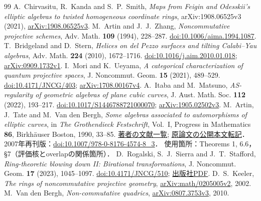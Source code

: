 \documentclass[11pt,a4paper]{ltjsarticle}
\begin{document}
\begin{thebibliography}{99}
\fontsize{11}{13.7}\selectfont
\setlength{\itemsep}{0pt}
\setlength{\parsep}{0pt}
 A.~Chirvasitu, R.~Kanda and S.~P.~Smith,
\emph{Maps from Feigin and Odesskii's elliptic algebras to twisted homogeneous coordinate rings},
arXiv:1908.06525v3 (2021),
\href{https://arxiv.org/abs/1908.06525v3}{arXiv:1908.06525v3}.
 M.~Artin and J.~J.~Zhang,
\emph{Noncommutative projective schemes}, Adv. Math. \textbf{109} (1994), 228--287.
\href{https://doi.org/10.1006/aima.1994.1087}{doi:10.1006/aima.1994.1087}.
 T.~Bridgeland and D.~Stern,
\emph{Helices on del Pezzo surfaces and tilting Calabi--Yau algebras},
Adv. Math. \textbf{224} (2010), 1672--1716.
\href{https://doi.org/10.1016/j.aim.2010.01.018}{doi:10.1016/j.aim.2010.01.018};
\href{https://arxiv.org/abs/0909.1732v1}{arXiv:0909.1732v1}.
 I.~Mori and K.~Ueyama,
\emph{A categorical characterization of quantum projective spaces},
J. Noncommut. Geom. \textbf{15} (2021), 489--529.
\href{https://doi.org/10.4171/JNCG/403}{doi:10.4171/JNCG/403};
\href{https://arxiv.org/abs/1708.00167v4}{arXiv:1708.00167v4}.
 A.~Itaba and M.~Matsuno,
\emph{AS-regularity of geometric algebras of plane cubic curves},
J. Aust. Math. Soc. \textbf{112} (2022), 193--217.
\href{https://doi.org/10.1017/S1446788721000070}{doi:10.1017/S1446788721000070};
\href{https://arxiv.org/abs/1905.02502v3}{arXiv:1905.02502v3}.
 M.~Artin, J.~Tate and M.~Van den Bergh,
\emph{Some algebras associated to automorphisms of elliptic curves},
in \emph{The Grothendieck Festschrift}, Vol.~I,
Progress in Mathematics \textbf{86}, Birkh\"auser Boston, 1990, 33--85.
\href{https://cantate.be/site/michel_pub.html}{著者の文献一覧};
\href{https://www.scribd.com/document/989427503/Artin-Tate-Aut-Elliptic-Curves}{原論文の公開本文転記}．
2007年再刊版：\href{https://doi.org/10.1007/978-0-8176-4574-8_3}{doi:10.1007/978-0-8176-4574-8\_3}．
使用箇所：Theorems 1, 6.6，\S7（評価核とoverlapの関係箇所）．
 D.~Rogalski, S.~J.~Sierra and J.~T.~Stafford,
\emph{Ring-theoretic blowing down II: Birational transformations},
J. Noncommut. Geom. \textbf{17} (2023), 1045--1097.
\href{https://doi.org/10.4171/JNCG/510}{doi:10.4171/JNCG/510};
\href{https://ems.press/content/serial-article-files/31044}{出版社PDF}.
 D.~S.~Keeler,
\emph{The rings of noncommutative projective geometry},
\href{https://arxiv.org/abs/math/0205005v2}{arXiv:math/0205005v2}, 2002.
 M.~Van den Bergh,
\emph{Non-commutative quadrics},
\href{https://arxiv.org/abs/0807.3753v3}{arXiv:0807.3753v3}, 2010.

\end{thebibliography}
\end{document}

